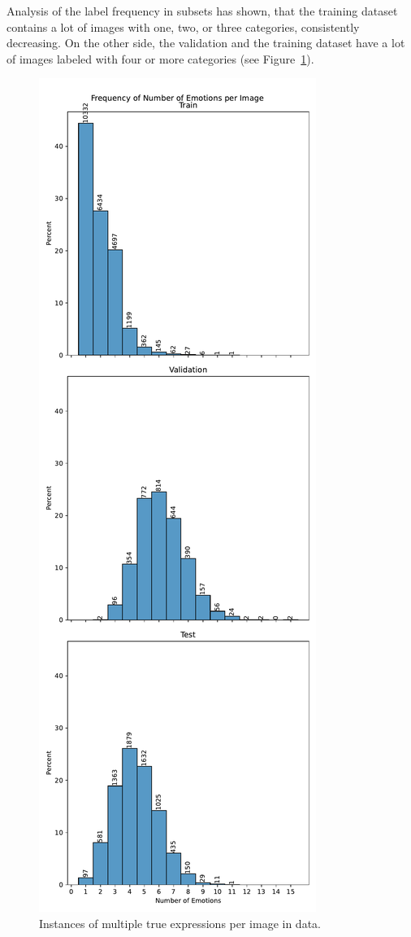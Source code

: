 Analysis of the label frequency in subsets has shown, that the training dataset contains a lot of images with one, two, or three categories, consistently decreasing. On the other side, the validation and the training dataset have a lot of images labeled with four or more categories  (see Figure~\ref{fig:emotic_label_occurance}). 

\begin{figure}[t]
    \centering
    \includegraphics[width=0.66\columnwidth]{pictures/emotic/frequency_of_expressions.pdf}
    \caption{Instances of multiple true expressions per image in \emotic{} data.}
    \label{fig:emotic_label_occurance}
\end{figure}

